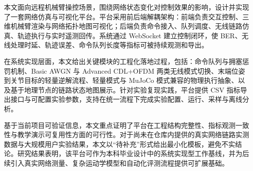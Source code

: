 
{}

\begin{abstractcn}
本文面向远程机械臂操控场景，围绕网络状态变化对控制效果的影响，设计并实现了一套网络仿真与可视化平台。平台采用前后端解耦架构：前端负责交互控制、三维机械臂渲染与网络拓扑地图可视化；后端负责命令接入、队列调度、无线链路仿真、轨迹执行与实时遥测回传。系统通过 WebSocket 建立控制闭环，使 BER、无线处理时延、轨迹误差、命令队列长度等指标可被持续观测和导出。

在系统实现层面，本文给出关键模块的工程化落地过程，包括：命令队列与拥塞惩罚机制、Basic AWGN 与 Advanced CDL+OFDM 两类无线模式切换、末端位姿到关节目标的轻量逆解流程、轻量模式与 MuJoCo 模式兼容的物理执行抽象、以及基于地理节点的链路状态地图展示。针对实验复现实践，平台提供 CSV 指标导出接口与可配置实验参数，支持在统一流程下完成实验配置、运行、采样与离线分析。

基于当前项目可验证信息，本文重点证明了平台在工程结构完整性、指标观测一致性与教学演示可复用性方面的可行性。对于尚未在仓库内提供的真实网络链路实测数据与大规模用户实验结果，本文以“待补充”形式给出最小化模板，避免不实结论。研究结果表明，该平台可作为本科毕业设计中的系统实现型工作基线，并为后续引入真实网络测量、复杂运动学模型和自动化评测流程提供可扩展基础。
\end{abstractcn}
